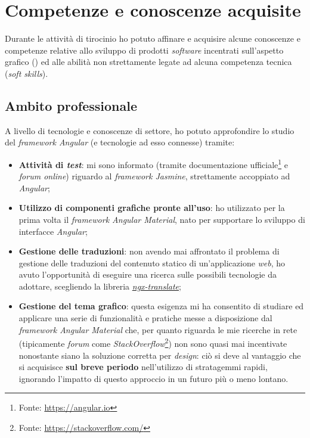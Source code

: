 \section{Competenze e conoscenze acquisite}
Durante le attività di tirocinio ho potuto affinare e acquisire alcune conoscenze e competenze relative allo sviluppo di prodotti \textit{software} incentrati sull'aspetto grafico () ed alle abilità non strettamente legate ad alcuna competenza tecnica (\textit{soft skills}).
\subsection*{Ambito professionale}
A livello di tecnologie e conoscenze di settore, ho potuto approfondire lo studio del \textit{framework Angular} (e tecnologie ad esso connesse) tramite:
\begin{itemize}
    \item \textbf{Attività di \textit{test}}: mi sono informato (tramite documentazione ufficiale\footnote{Fonte: \href{https://angular.io/guide/testing}{https://angular.io}} e \textit{forum online}) riguardo al \textit{framework Jasmine}, strettamente accoppiato ad \textit{Angular};
    \item \textbf{Utilizzo di componenti grafiche pronte all'uso}: ho utilizzato per la prima volta il \textit{framework Angular Material}, nato per supportare lo sviluppo di interfacce \textit{Angular};
    \item \textbf{Gestione delle traduzioni}: non avendo mai affrontato il problema di gestione delle traduzioni del contenuto statico di un'applicazione \textit{web}, ho avuto l'opportunità di eseguire una ricerca sulle possibili tecnologie da adottare, scegliendo la libreria \hyperref[subsubsec:ngx]{\textit{ngx-translate}};
    \item \textbf{Gestione del tema grafico}: questa esigenza mi ha consentito di studiare ed applicare una serie di funzionalità e pratiche messe a disposizione dal \textit{framework Angular Material} che, per quanto riguarda le mie ricerche in rete (tipicamente \textit{forum} come \textit{StackOverflow}\footnote{Fonte: \href{https://stackoverflow.com/}{https://stackoverflow.com/}})
        non sono quasi mai incentivate nonostante siano la soluzione corretta per \textit{design}: ciò si deve al vantaggio che si acquisisce \textbf{sul breve periodo} nell'utilizzo di stratagemmi rapidi, ignorando l'impatto di questo approccio in un futuro più o meno lontano.
\end{itemize}

